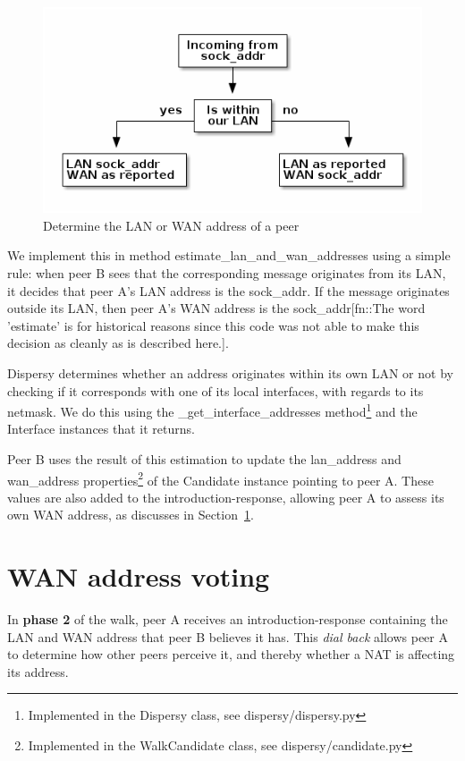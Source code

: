\begin{figure}{}
\centering
\includegraphics[width=.9\linewidth]{determine-lan-wan.png}
\caption{\label{fig:determine-lan-wan}Determine the LAN or WAN address of a peer}
\end{figure}

We implement this in method estimate\_lan\_and\_wan\_addresses using a
simple rule: when peer B sees that the corresponding message
originates from its LAN, it decides that peer A’s LAN address is the
sock\_addr.  If the message originates outside its LAN, then peer A’s
WAN address is the sock\_addr[fn::The word 'estimate' is for historical
reasons since this code was not able to make this decision as cleanly
as is described here.].

Dispersy determines whether an address originates within its own LAN
or not by checking if it corresponds with one of its local interfaces,
with regards to its netmask.  We do this using the
\_get\_interface\_addresses method\footnote{Implemented in the Dispersy class, see dispersy/dispersy.py} and the Interface
instances that it returns.

Peer B uses the result of this estimation to update the lan\_address
and wan\_address properties\footnote{Implemented in the WalkCandidate class, see dispersy/candidate.py} of the Candidate instance
pointing to peer A.  These values are also added to the
introduction-response, allowing peer A to assess its own WAN address,
as discusses in Section~\ref{sec-6}.
\section{WAN address voting}
\label{sec-6}
In \textbf{phase 2} of the walk, peer A receives an introduction-response
containing the LAN and WAN address that peer B believes it has.  This
\emph{dial back} allows peer A to determine how other peers perceive it,
and thereby whether a NAT is affecting its address.

